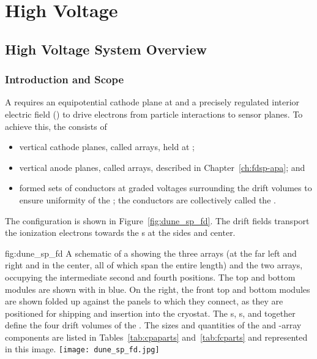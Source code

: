 \chapter{High Voltage}
\label{ch:sp-hv}
\section{High Voltage System Overview}
\label{sec:fdsp-hv-ov}

\subsection{Introduction and Scope}
\label{sec:fdsp-hv-intro}

A  requires an equipotential cathode plane at  and a precisely regulated interior electric field (\efield{}) to drive 
electrons from particle interactions to sensor planes.  To achieve this, the     consists of 
\begin{itemize}
\item vertical cathode planes, called  arrays, held at ;
\item vertical anode planes, called  arrays, described in Chapter~\ref{ch:fdsp-apa}; and
\item formed sets of conductors at graded voltages surrounding 
 the drift volumes to ensure uniformity of the \efield; the conductors are collectively called the .
\end{itemize}

The \single {} configuration is shown in Figure~\ref{fig:dune_sp_fd}.
The  drift fields transport the ionization electrons 
towards the s at the sides and center.

\begin{dunefigure}
{fig:dune_sp_fd}
{A schematic of a  showing the three  arrays (at the far left and right and in the center, all of which span the entire \sptpclen {} length) and the two  arrays, occupying the intermediate second and fourth positions. The top and bottom  modules are shown with  in blue. 
On the right, the front top and bottom  modules are shown folded up against the  panels to which they connect, as they are positioned for shipping and insertion into the cryostat.  The s, s, and  together define the four drift volumes of the . The sizes and quantities of the  and -array components are listed in Tables~\ref{tab:cpaparts} and~\ref{tab:fcparts} and represented in this image.}
\texttt{[image: dune\_sp\_fd.jpg]}
\end{dunefigure}

